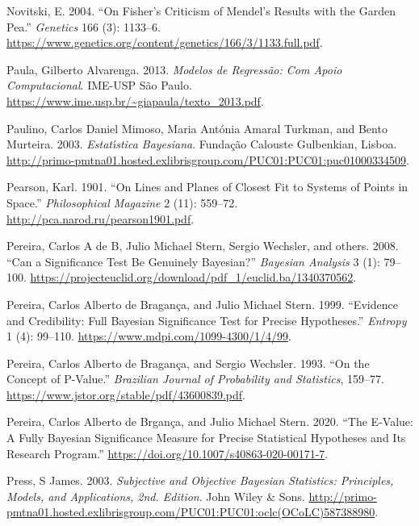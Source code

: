 \documentclass[
]{book}
\newlength{\cslhangindent}
\newenvironment{cslreferences}%
  {\setlength{\parindent}{0pt}%
  \everypar{\setlength{\hangindent}{\cslhangindent}}\ignorespaces}%
  {\par}
\theoremstyle{definition}
\theoremstyle{definition}
\theoremstyle{definition}
\theoremstyle{remark}
\begin{document}
\begin{cslreferences}
\leavevmode\hypertarget{ref-novitski2004fisher}{}%
Novitski, E. 2004. ``On Fisher's Criticism of Mendel's Results with the Garden Pea.'' \emph{Genetics} 166 (3): 1133--6. \url{https://www.genetics.org/content/genetics/166/3/1133.full.pdf}.

\leavevmode\hypertarget{ref-paula2013modelos}{}%
Paula, Gilberto Alvarenga. 2013. \emph{Modelos de Regressão: Com Apoio Computacional}. IME-USP São Paulo. \url{https://www.ime.usp.br/~giapaula/texto_2013.pdf}.

\leavevmode\hypertarget{ref-paulino2003estatistica}{}%
Paulino, Carlos Daniel Mimoso, Maria Antónia Amaral Turkman, and Bento Murteira. 2003. \emph{Estatı́stica Bayesiana}. Fundação Calouste Gulbenkian, Lisboa. \url{http://primo-pmtna01.hosted.exlibrisgroup.com/PUC01:PUC01:puc01000334509}.

\leavevmode\hypertarget{ref-pearson1901on}{}%
Pearson, Karl. 1901. ``On Lines and Planes of Closest Fit to Systems of Points in Space.'' \emph{Philosophical Magazine} 2 (11): 559--72. \url{http://pca.narod.ru/pearson1901.pdf}.

\leavevmode\hypertarget{ref-pereira2008can}{}%
Pereira, Carlos A de B, Julio Michael Stern, Sergio Wechsler, and others. 2008. ``Can a Significance Test Be Genuinely Bayesian?'' \emph{Bayesian Analysis} 3 (1): 79--100. \url{https://projecteuclid.org/download/pdf_1/euclid.ba/1340370562}.

\leavevmode\hypertarget{ref-pereira1999evidence}{}%
Pereira, Carlos Alberto de Bragança, and Julio Michael Stern. 1999. ``Evidence and Credibility: Full Bayesian Significance Test for Precise Hypotheses.'' \emph{Entropy} 1 (4): 99--110. \url{https://www.mdpi.com/1099-4300/1/4/99}.

\leavevmode\hypertarget{ref-pereira1993concept}{}%
Pereira, Carlos Alberto de Bragança, and Sergio Wechsler. 1993. ``On the Concept of P-Value.'' \emph{Brazilian Journal of Probability and Statistics}, 159--77. \url{https://www.jstor.org/stable/pdf/43600839.pdf}.

\leavevmode\hypertarget{ref-pereira2020evalue}{}%
Pereira, Carlos Alberto de Brgança, and Julio Michael Stern. 2020. ``The E-Value: A Fully Bayesian Significance Measure for Precise Statistical Hypotheses and Its Research Program.'' \url{https://doi.org/10.1007/s40863-020-00171-7}.

\leavevmode\hypertarget{ref-press2003subjective}{}%
Press, S James. 2003. \emph{Subjective and Objective Bayesian Statistics: Principles, Models, and Applications, 2nd. Edition}. John Wiley \& Sons. \url{http://primo-pmtna01.hosted.exlibrisgroup.com/PUC01:PUC01:oclc(OCoLC)587388980}.


\end{cslreferences}
\end{document}
